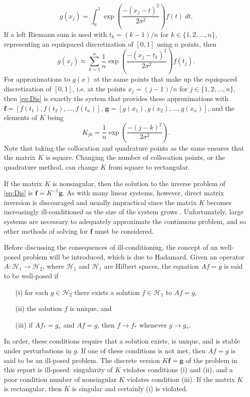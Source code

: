 \documentclass[12pt]{book}
\newcommand{\gVec}{\mathbf{g}}	%
\newcommand{\kMat}{K}	%
\newcommand{\fVec}{\mathbf{f}}	%
\newcommand{\noiseSD}{\sigma}	%
\begin{document}
\[g(x_j) = \int_0^1 \exp\left(\frac{-(x_j - t)^2}{2\noiseSD^2}\right)f(t) \: dt.\]
If a left Riemann sum is used with $t_k = (k-1)/n$ for $k \in \{1,2,\ldots,n\}$, representing an equispaced discretization of $[0,1]$ using $n$ points, then
\[g(x_j) \approx \sum_{k=1}^n \frac{1}{n}\exp\left(\frac{-(x_j - t_k)^2}{2\noiseSD^2}\right)f(t_j).\]
For approximations to $g(x)$ at the same points that make up the equispaced discretization of $[0,1]$, i.e. at the points $x_j = (j-1)/n$ for $j \in \{1,2,\ldots,n\}$, then \eqref{eq:Dis} is exactly the system that provides these approximations with $\fVec = [f(t_1),f(t_2),\ldots,f(t_n)]$, $\gVec = [g(x_1),g(x_2),\ldots,g(x_n)]$, and the elements of $\kMat$ being
\[K_{jk} = \frac{1}{n}\exp\left(\frac{-(j - k)^2}{2\noiseSD^2}\right).\]
Note that taking the collocation and quadrature points as the same ensures that the matrix $\kMat$ is square. Changing the number of collocation points, or the quadrature method, can change $\kMat$ from square to rectangular. \par
If the matrix $\kMat$ is nonsingular, then the solution to the inverse problem of \eqref{eq:Dis} is $\fVec = \kMat^{-1}\gVec$. As with many linear systems, however, direct matrix inversion is discouraged and usually impractical since the matrix $\kMat$ becomes increasingly ill-conditioned as the size of the system grows \cite{Vogel:2002}. Unfortunately, large systems are necessary to adequately approximate the continuous problem, and so other methods of solving for $\fVec$ must be considered. \par
Before discussing the consequences of ill-conditioning, the concept of an well-posed problem will be introduced, which is due to Hadamard. Given an operator $A : \mathcal{H}_1 \rightarrow \mathcal{H}_2$, where $\mathcal{H}_1$ and $\mathcal{H}_1$ are Hilbert spaces, the equation $Af = g$ is said to be well-posed if
\begin{enumerate}
\item[(i)] for each $g \in \mathcal{H}_2$ there exists a solution $f \in \mathcal{H}_1$ to $Af = g$,
\item[(ii)] the solution $f$ is unique, and
\item[(iii)] if $Af_* = g_*$ and $Af = g$, then $f \rightarrow f_*$ whenever $g \rightarrow g_*$.
\end{enumerate}
In order, these conditions require that a solution exists, is unique, and is stable under perturbations in $g$. If one of these conditions is not met, then $Af = g$ is said to be an ill-posed problem. The discrete version $\kMat\fVec = \gVec$ of the problem in this report is ill-posed: singularity of $\kMat$ violates conditions (i) and (ii), and a poor condition number of nonsingular $\kMat$ violates condition (iii). If the matrix $\kMat$ is rectangular, then $\kMat$ is singular and certainly (i) is violated.  \par 
\end{document}
